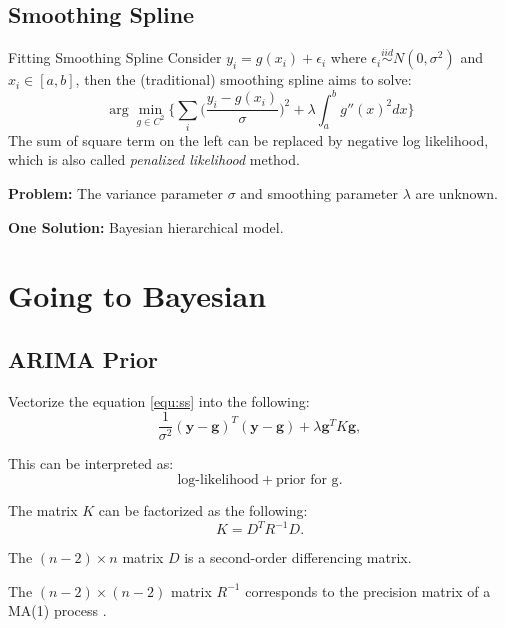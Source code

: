 \documentclass{beamer} %
\begin{document}
\subsection{Smoothing Spline}
\begin{frame}
\begin{block}{Fitting Smoothing Spline}
Consider $y_i = g(x_i) + \epsilon_i$ where $\epsilon_i \overset{iid}\sim N(0,\sigma^2)$ and $x_i \in [a,b]$, then the (traditional) smoothing spline aims to solve:
\pause
\begin{equation}\label{equ:ss}
\arg\min_{g\in C^2} \bigg\{ \sum_i \bigg(\frac{y_i-g(x_i)}{\sigma}\bigg)^2 + \lambda  \int_a^b g''(x)^2 dx \bigg\}
\end{equation}
\pause
The sum of square term on the left can be replaced by negative log likelihood, which is also called \textit{penalized likelihood} method.
\end{block}
\pause
\textbf{Problem:} The variance parameter $\sigma$ and smoothing parameter $\lambda$ are unknown.

\pause
\textbf{One Solution:} Bayesian hierarchical model.
\end{frame}



\section{Going to Bayesian}

\subsection{ARIMA Prior}
\begin{frame}
Vectorize the equation \ref{equ:ss} into the following:
\pause
\begin{equation}\label{equ:vectorss}
\frac{1}{ \sigma^2}(\boldsymbol{y} - \boldsymbol{g})^T (\boldsymbol{y} - \boldsymbol{g}) + \lambda \boldsymbol{g}^T K \boldsymbol{g},
\end{equation}

\pause
This can be interpreted as:
\begin{equation}\label{equ:interpretation}
\text{log-likelihood} + \text{prior for g}.
\end{equation}

\pause
The matrix $K$ can be factorized as the following:
\pause
\begin{equation}\label{equ:ArimaPrior}
K = D^T R^{-1} D.
\end{equation}

\pause
The $(n-2) \times n$ matrix $D$ is a second-order differencing matrix. 

\pause
The $(n-2) \times (n-2)$ matrix $R^{-1}$ corresponds to the precision matrix of a MA(1) process \citep{ARIMA}.

\end{frame}
\end{document}
